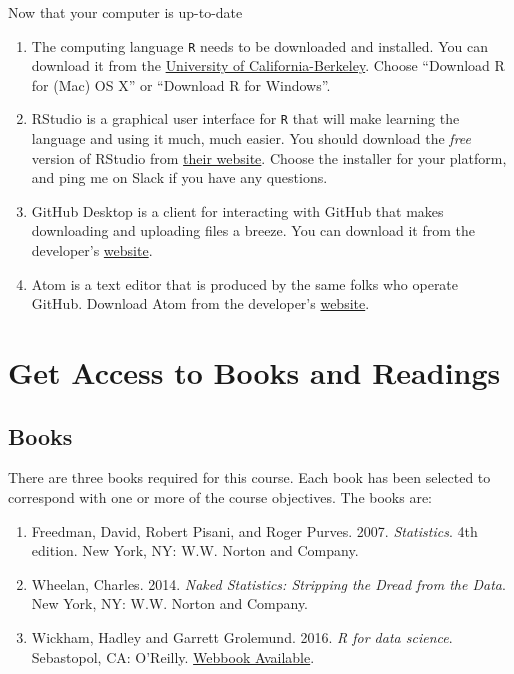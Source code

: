 \documentclass[]{book}
\theoremstyle{definition}
\theoremstyle{definition}
\theoremstyle{definition}
\theoremstyle{remark}
\begin{document}
Now that your computer is up-to-date

\begin{enumerate}
\def\labelenumi{\arabic{enumi}.}
\item
  The computing language \texttt{R} needs to be downloaded and
  installed. You can download it from the
  \href{https://cran.cnr.berkeley.edu}{University of
  California-Berkeley}. Choose ``Download R for (Mac) OS X'' or
  ``Download R for Windows''.
\item
  RStudio is a graphical user interface for \texttt{R} that will make
  learning the language and using it much, much easier. You should
  download the \emph{free} version of RStudio from
  \href{https://www.rstudio.com/products/rstudio/download/\#download}{their
  website}. Choose the installer for your platform, and ping me on Slack
  if you have any questions.
\item
  GitHub Desktop is a client for interacting with GitHub that makes
  downloading and uploading files a breeze. You can download it from the
  developer's \href{http://desktop.github.com}{website}.
\item
  Atom is a text editor that is produced by the same folks who operate
  GitHub. Download Atom from the developer's
  \href{http://atom.io}{website}.
\end{enumerate}

\section{Get Access to Books and
Readings}\label{get-access-to-books-and-readings}

\subsection{Books}\label{books}

There are three books required for this course. Each book has been
selected to correspond with one or more of the course objectives. The
books are:

\begin{enumerate}
\def\labelenumi{\arabic{enumi}.}
\item
  Freedman, David, Robert Pisani, and Roger Purves. 2007.
  \emph{Statistics}. 4th edition. New York, NY: W.W. Norton and Company.
\item
  Wheelan, Charles. 2014. \emph{Naked Statistics: Stripping the Dread
  from the Data}. New York, NY: W.W. Norton and Company.
\item
  Wickham, Hadley and Garrett Grolemund. 2016. \emph{R for data
  science}. Sebastopol, CA: O'Reilly.
  \href{http://r4ds.had.co.nz}{Webbook Available}.
\end{enumerate}
\end{document}
